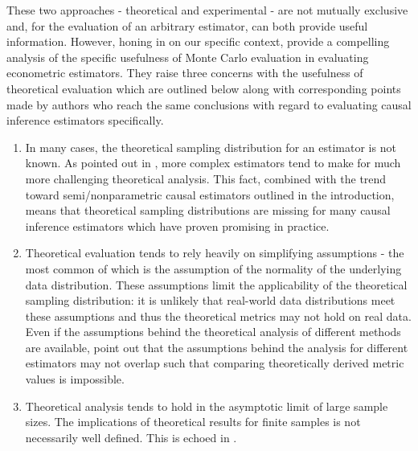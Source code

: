 \documentclass[../main.tex]{subfiles}
\begin{document}
\vspace{\baselineskip}
These two approaches - theoretical and experimental - are not mutually exclusive and, for the evaluation of an arbitrary estimator, can both provide useful information. However, honing in on our specific context, \textcite{Paxton2001MonteImplementation} provide a compelling analysis of the specific usefulness of Monte Carlo evaluation in evaluating econometric estimators. They raise three concerns with the usefulness of theoretical evaluation which are outlined below along with corresponding points made by authors who reach the same conclusions with regard to evaluating causal inference estimators specifically.\par


\vspace{\baselineskip}
\begin{enumerate}
	\item In many cases, the theoretical sampling distribution for an estimator is not known. As pointed out in \textcite{Knaus2018MachineEvidence}, more complex estimators tend to make for much more challenging theoretical analysis. This fact, combined with the trend toward semi/nonparametric causal estimators outlined in the introduction, means that theoretical sampling distributions are missing for many causal inference estimators which have proven promising in practice.\par


\vspace{\baselineskip}
	\item Theoretical evaluation tends to rely heavily on simplifying assumptions - the most common of which is the assumption of the normality of the underlying data distribution. These assumptions limit the applicability of the theoretical sampling distribution: it is unlikely that real-world data distributions meet these assumptions and thus the theoretical metrics may not hold on real data. Even if the assumptions behind the theoretical analysis of different methods are available, \textcite{Knaus2018MachineEvidence} point out that the assumptions behind the analysis for different estimators may not overlap such that comparing theoretically derived metric values is impossible.\par


\vspace{\baselineskip}
	\item Theoretical analysis tends to hold in the asymptotic limit of large sample sizes. The implications of theoretical results for finite samples is not necessarily well defined. This is echoed in \textcite{Huber2013TheScore}.
\end{enumerate}\par
\end{document}
